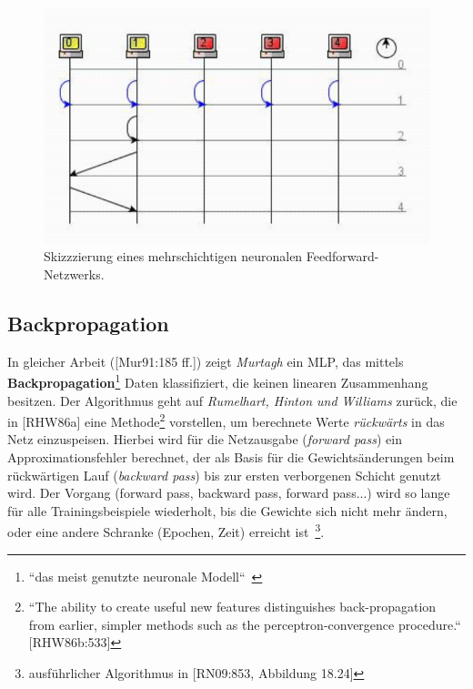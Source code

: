 \begin{figure}[h]
    \centering
    \includegraphics{images/p1ReadSeq.pdf}
    \caption{Skizzzierung eines mehrschichtigen neuronalen Feedforward-Netzwerks.}
    \label{fig-multilayerfeedforward}
\end{figure}



\subsection{Backpropagation}
In gleicher Arbeit ([Mur91:185 ff.]) zeigt \textit{Murtagh} ein MLP, das mittels \textbf{Backpropagation}\footnote{
    ``das meist genutzte neuronale Modell``~\cite[313]{Ert21b}
} Daten klassifiziert, die keinen linearen Zusammenhang besitzen.
Der Algorithmus geht auf \textit{Rumelhart, Hinton und Williams} zurück, die in [RHW86a] eine Methode\footnote{
    ``The ability to create useful new features distinguishes back-propagation from earlier, simpler methods such as the perceptron-convergence procedure.`` [RHW86b:533]
} vorstellen, um berechnete Werte \textit{rückwärts} in das Netz einzuspeisen.
Hierbei wird für die Netzausgabe (\textit{forward pass}) ein Approximationsfehler berechnet, der als Basis für die Gewichtsänderungen beim rückwärtigen Lauf (\textit{backward pass}) bis zur ersten verborgenen Schicht genutzt wird.
Der Vorgang (forward pass, backward pass, forward pass...) wird so lange für alle Trainingsbeispiele wiederholt, bis die Gewichte sich nicht mehr ändern, oder eine andere Schranke (Epochen, Zeit) erreicht ist~\cite[315]{Ert21b}\footnote{
    ausführlicher Algorithmus in [RN09:853, Abbildung 18.24]
}.



